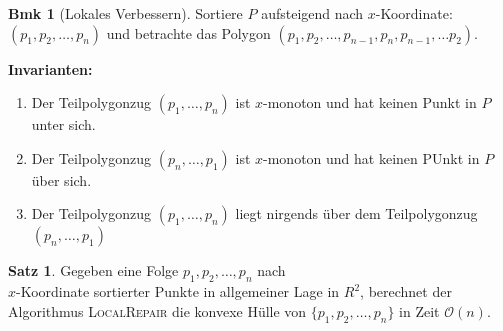 \documentclass[a4paper, 10pt]{article}
\theoremstyle{definition}
\newtheorem{theorem}[definition]{Satz}
\newtheorem*{note}{Bmk}
\theoremstyle{named}
\newcommand{\BO}{\mathcal{O}}
\begin{document}
\begin{note}[Lokales Verbessern]
    Sortiere $P$ aufsteigend nach $x$-Koordinate: $(p_1, p_2, \ldots, p_n)$ und betrachte das Polygon $(p_1, p_2, \ldots, p_{n-1}, p_n, p_{n-1}, \ldots p_2)$.

    \textbf{Invarianten:}
    \begin{enumerate}
        \item Der Teilpolygonzug $(p_1, \ldots, p_n)$ ist $x$-monoton und hat keinen Punkt in $P$ unter sich.
        \item Der Teilpolygonzug $(p_n, \ldots, p_1)$ ist $x$-monoton und hat keinen PUnkt in $P$ über sich.
        \item Der Teilpolygonzug $(p_1, \ldots, p_n)$ liegt nirgends über dem Teilpolygonzug $(p_n, \ldots, p_1)$
    \end{enumerate}
\end{note}

\begin{theorem}
    Gegeben eine Folge $p_1, p_2, \ldots, p_n$ nach \\
    $x$-Koordinate sortierter Punkte in allgemeiner Lage in $R^2$, berechnet der Algorithmus \textsc{LocalRepair} die konvexe Hülle von $\{p_1, p_2, \ldots, p_n\}$ in Zeit $\BO(n)$.
\end{theorem}
\end{document}
